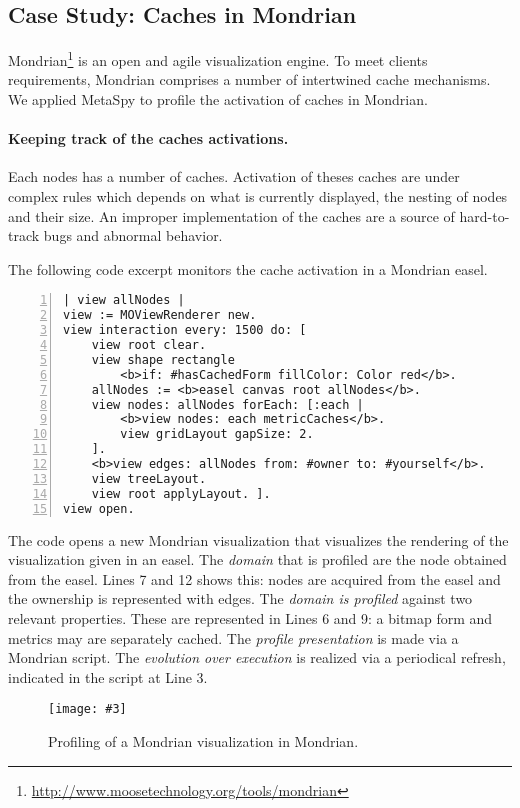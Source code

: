 \documentclass[runningheads]{llncs}
\newcommand{\project}{{\sc MetaSpy}\xspace}
\newcommand{\fig}[4]{
	\begin{figure}[#1]
		\centering
		\texttt{[image: \#3]}
		\caption{\label{fig:#3}#4}
	\end{figure}}
\begin{document}
\subsection{Case Study: Caches in Mondrian}

Mondrian\footnote{\url{http://www.moosetechnology.org/tools/mondrian}} is an open and agile visualization engine. 
To meet clients requirements, Mondrian comprises a number of intertwined cache mechanisms. We applied \project to profile the activation of caches in Mondrian.

\paragraph{Keeping track of the caches activations.}
Each nodes has a number of caches. Activation of theses caches are under complex rules which depends on what is currently displayed, the nesting of nodes and their size. An improper implementation of the caches are a source of hard-to-track bugs and abnormal behavior.

The following code excerpt monitors the cache activation in a Mondrian easel.

\begin{lstlisting}[numbers=left]
| view allNodes |
view := MOViewRenderer new.
view interaction every: 1500 do: [
	view root clear.
	view shape rectangle
		<b>if: #hasCachedForm fillColor: Color red</b>.
	allNodes := <b>easel canvas root allNodes</b>.
	view nodes: allNodes forEach: [:each |
		<b>view nodes: each metricCaches</b>.
		view gridLayout gapSize: 2.
	].  
	<b>view edges: allNodes from: #owner to: #yourself</b>.
	view treeLayout.
	view root applyLayout. ].	
view open.
\end{lstlisting}

The code opens a new Mondrian visualization that visualizes the rendering of the visualization given in an easel. The \emph{domain} that is profiled are the node obtained from the easel. Lines 7 and 12 shows this: nodes are acquired from the easel and the ownership is represented with edges. The \emph{domain is profiled} against two relevant properties. These are represented in Lines 6 and 9: a bitmap form and metrics may are separately cached. The \emph{profile presentation} is made via a Mondrian script. The \emph{evolution over execution} is realized via a periodical refresh, indicated in the script at Line 3.

\fig{}{.8}{MondrianExample}{Profiling of a Mondrian visualization in Mondrian.}
\end{document}
